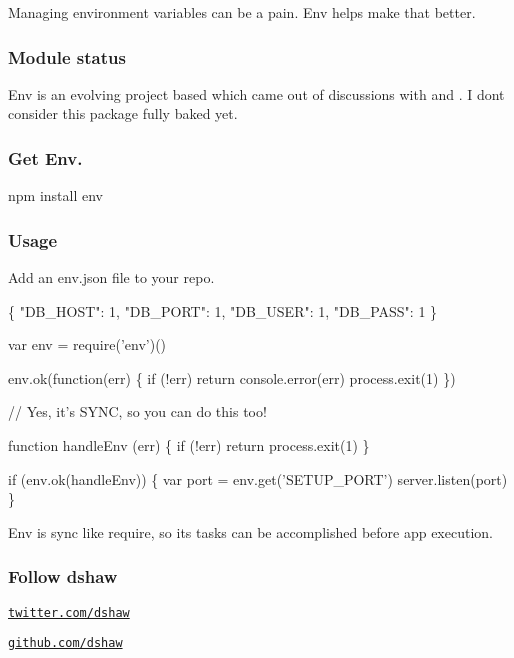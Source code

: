 \href{http://travis-ci.org/dshaw/env}{\tt }

Managing environment variables can be a pain. Env helps make that better.

\subsubsection*{Module status}

Env is an evolving project based which came out of discussions with \href{http://twitter.com/joemccann}{\tt } and \href{http://twitter.com/clintandrewhall}{\tt }. I don\textquotesingle{}t consider this package fully baked yet.

\subsubsection*{Get Env.}


\begin{DoxyCode}
npm install env
\end{DoxyCode}


\subsubsection*{Usage}

Add an env.\+json file to your repo.


\begin{DoxyCode}
\{
  "DB\_HOST": 1,
  "DB\_PORT": 1,
  "DB\_USER": 1,
  "DB\_PASS": 1
\}
\end{DoxyCode}



\begin{DoxyCode}
var env = require('env')()

env.ok(function(err) \{
  if (!err) return
  console.error(err)
  process.exit(1)
\})

// Yes, it's SYNC, so you can do this too!

function handleEnv (err) \{
  if (!err) return
  process.exit(1)
\}

if (env.ok(handleEnv)) \{
  var port = env.get('SETUP\_PORT')
  server.listen(port)
\}
\end{DoxyCode}


Env is sync like require, so it\textquotesingle{}s tasks can be accomplished before app execution.

\subsubsection*{Follow dshaw}


\begin{DoxyItemize}
\item \href{http://twitter.com/dshaw}{\tt twitter.\+com/dshaw}
\item \href{http://github.com/dshaw}{\tt github.\+com/dshaw} 
\end{DoxyItemize}